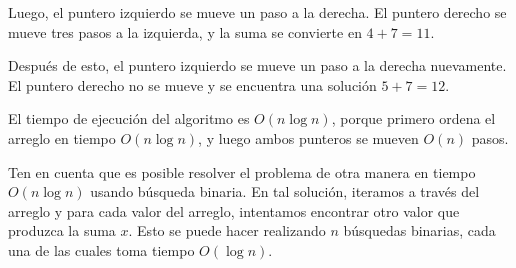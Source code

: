 Luego, el puntero izquierdo se mueve un paso a la derecha.
El puntero derecho se mueve tres pasos a la izquierda,
y la suma se convierte en $4+7=11$.

\begin{center}
\end{center}

Después de esto, el puntero izquierdo se mueve un paso a la derecha nuevamente.
El puntero derecho no se mueve y se encuentra una solución
$5+7=12$.

\begin{center}
\end{center}

El tiempo de ejecución del algoritmo es
$O(n \log n)$, porque primero ordena
el arreglo en tiempo $O(n \log n)$,
y luego ambos punteros se mueven $O(n)$ pasos.

Ten en cuenta que es posible resolver el problema
de otra manera en tiempo $O(n \log n)$ usando búsqueda binaria.
En tal solución, iteramos a través del arreglo
y para cada valor del arreglo, intentamos encontrar otro
valor que produzca la suma $x$.
Esto se puede hacer realizando $n$ búsquedas binarias,
cada una de las cuales toma tiempo $O(\log n)$.

